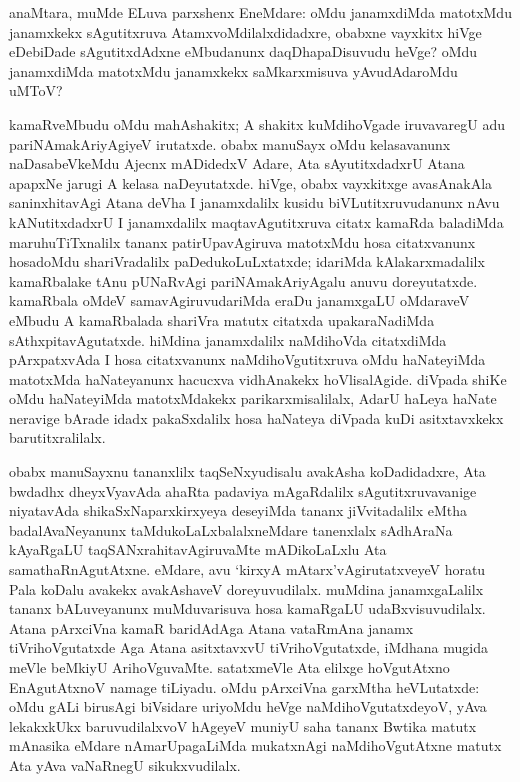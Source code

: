 anaMtara, muMde ELuva parxshenx EneMdare: oMdu janamxdiMda matotxMdu janamxkekx sAgutitxruva AtamxvoMdilalxdidadxre, obabxne vayxkitx hiVge eDebiDade sAgutitxdAdxne eMbudanunx daqDhapaDisuvudu heVge? oMdu janamxdiMda matotxMdu janamxkekx saMkarxmisuva yAvudAdaroMdu uMToV?

kamaRveMbudu oMdu mahAshakitx; A shakitx kuMdihoVgade iruvavaregU adu pariNAmakAriyAgiyeV irutatxde. obabx manuSayx oMdu kelasavanunx naDasabeVkeMdu Ajecnx mADidedxV Adare, Ata sAyutitxdadxrU Atana apapxNe jarugi A kelasa naDeyutatxde. hiVge, obabx vayxkitxge avasAnakAla saninxhitavAgi Atana deVha I janamxdalilx kusidu biVLutitxruvudanunx nAvu kANutitxdadxrU I janamxdalilx maqtavAgutitxruva citatx kamaRda baladiMda maruhuTiTxnalilx tananx patirUpavAgiruva matotxMdu hosa citatxvanunx hosadoMdu shariVradalilx paDedukoLuLxtatxde; idariMda kAlakarxmadalilx kamaRbalake tAnu pUNaRvAgi pariNAmakAriyAgalu anuvu doreyutatxde. kamaRbala oMdeV samavAgiruvudariMda eraDu janamxgaLU oMdaraveV eMbudu A kamaRbalada shariVra matutx citatxda upakaraNadiMda sAthxpitavAgutatxde. hiMdina janamxdalilx naMdihoVda citatxdiMda pArxpatxvAda I hosa citatxvanunx naMdihoVgutitxruva oMdu haNateyiMda matotxMda haNateyanunx hacucxva vidhAnakekx hoVlisalAgide. diVpada shiKe oMdu haNateyiMda matotxMdakekx parikarxmisalilalx, AdarU haLeya haNate neravige bArade idadx pakaSxdalilx hosa haNateya diVpada kuDi asitxtavxkekx barutitxralilalx.

obabx manuSayxnu tananxlilx taqSeNxyudisalu avakAsha koDadidadxre, Ata bwdadhx dheyxVya\-vAda ahaRta padaviya mAgaRdalilx sAgutitxruvavanige niyatavAda shikaSxNaparxkirxyeya deseyiMda tananx jiVvitadalilx eMtha badalAvaNeyanunx taMdukoLaLxbalalxneMdare tanenxlalx sAdhAraNa kAyaRgaLU taqSANxrahitavAgiruvaMte mADikoLaLxlu Ata samathaRnAgu\-tAtxne. eMdare, avu `kirxyA mAtarx'vAgirutatxveyeV horatu Pala koDalu avakekx avakAshaveV doreyuvudilalx. muMdina janamxgaLalilx tananx bALuveyanunx muMdu\-varisuva hosa kamaRgaLU udaBxvisuvudilalx. Atana pArxciVna kamaR baridAdAga Atana vataRmAna janamx tiVrihoVgutatxde Aga Atana asitxtavxvU tiVrihoVgutatxde, iMdhana mugida meVle beMkiyU ArihoVguvaMte. satatxmeVle Ata elilxge hoVgutAtxno EnAgutAtxnoV namage tiLiyadu. oMdu pArxciVna garxMtha heVLutatxde: oMdu gALi birusAgi biVsidare uriyoMdu heVge naMdihoVgutatxdeyoV, yAva lekakxkUkx baruvudilalxvoV hAgeyeV muniyU saha tananx Bwtika matutx mAnasika eMdare nAmarUpagaLiMda mukatxnAgi naMdihoVgutAtxne matutx Ata yAva vaNaRnegU sikukxvudilalx.

